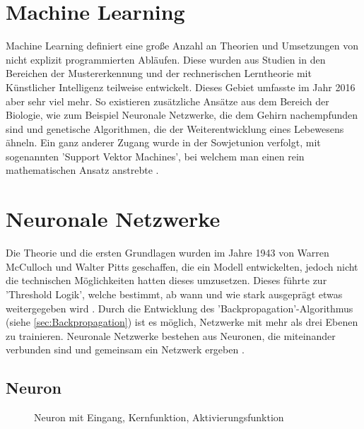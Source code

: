 \section{Machine Learning}
\label{sec:Machine Learning}

Machine Learning definiert eine große Anzahl an Theorien und Umsetzungen von nicht explizit programmierten Abläufen. 
Diese wurden aus Studien in den Bereichen der Mustererkennung und der rechnerischen Lerntheorie mit Künstlicher Intelligenz teilweise entwickelt. 
Dieses Gebiet umfasste im Jahr 2016 aber sehr viel mehr. 
So existieren zusätzliche Ansätze aus dem Bereich der Biologie, wie zum Beispiel Neuronale Netzwerke, die dem Gehirn nachempfunden sind und genetische Algorithmen, die der Weiterentwicklung eines Lebewesens ähneln. 
Ein ganz anderer Zugang wurde in der Sowjetunion verfolgt, mit sogenannten 'Support Vektor Machines', bei welchem man einen rein mathematischen Ansatz anstrebte \cite{lampropoulos2015machine}. 

\section{Neuronale Netzwerke}

Die Theorie und die ersten Grundlagen wurden im Jahre 1943 von Warren McCulloch und Walter Pitts geschaffen, die ein Modell entwickelten, jedoch nicht die technischen Möglichkeiten hatten dieses umzusetzen.
Dieses führte zur 'Threshold Logik', welche bestimmt, ab wann und wie stark ausgeprägt etwas weitergegeben wird \cite{rojas2013neural}.
Durch die Entwicklung des 'Backpropagation'-Algorithmus (siehe \ref{sec:Backpropagation}) ist es möglich, Netzwerke mit mehr als drei Ebenen zu trainieren.
Neuronale Netzwerke bestehen aus Neuronen, die miteinander verbunden sind und gemeinsam ein Netzwerk ergeben \cite{AI3}.  

\subsection{Neuron}
\label{sec:Neuron}

\begin{figure}
\centering


	\caption{Neuron mit Eingang, Kernfunktion, Aktivierungsfunktion}
	\label{fig:Neuron}
\end{figure}

